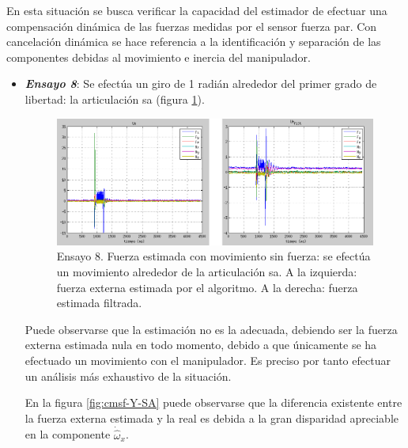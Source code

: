 En esta situación se busca verificar la capacidad del estimador de efectuar una compensación dinámica de las fuerzas medidas por el sensor fuerza par. Con cancelación dinámica se hace referencia a la identificación y separación de las componentes debidas al movimiento e inercia del manipulador. \par 

\begin{itemize}
\item \textbf{\emph{Ensayo 8}}: Se efectúa un giro de 1 radián alrededor del primer grado de libertad: la articulación \acrshort{sa} (figura \ref{fig:cmsf-SA}). \par 

\begin{figure}[h!]
\centering
\includegraphics[scale=0.4]{Figuras/cmsf-SA}
\caption[Ensayo 8. Fuerza estimada con movimiento y sin fuerza]{Ensayo 8. Fuerza estimada con movimiento sin fuerza: se efectúa un movimiento alrededor de la articulación \acrshort{sa}. A la izquierda: fuerza externa estimada por el algoritmo. A la derecha: fuerza estimada filtrada.}
\label{fig:cmsf-SA}
\end{figure}

Puede observarse que la estimación no es la adecuada, debiendo ser la fuerza externa estimada nula en todo momento, debido a que únicamente se ha efectuado un movimiento con el manipulador. Es preciso por tanto efectuar un análisis más exhaustivo de la situación. \par 

En la figura \ref{fig:cmsf-Y-SA} puede observarse que la diferencia existente entre la fuerza externa estimada y la real es debida a la gran disparidad apreciable en la componente $\dot{\hat{\omega}}_x$. \par 


\end{itemize}
